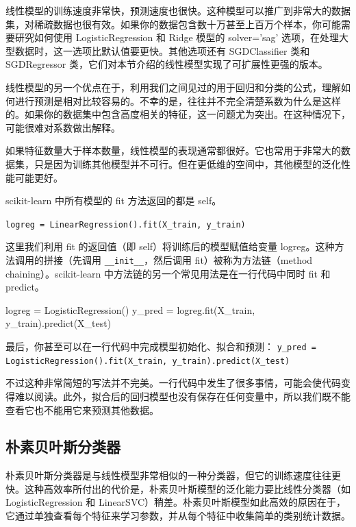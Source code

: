 线性模型的训练速度非常快，预测速度也很快。这种模型可以推广到非常大的数据集，对稀疏数据也很有效。如果你的数据包含数十万甚至上百万个样本，你可能需要研究如何使用 LogisticRegression 和 Ridge 模型的 solver='sag' 选项，在处理大型数据时，这一选项比默认值要更快。其他选项还有 SGDClassifier 类和 SGDRegressor 类，它们对本节介绍的线性模型实现了可扩展性更强的版本。

线性模型的另一个优点在于，利用我们之间见过的用于回归和分类的公式，理解如何进行预测是相对比较容易的。不幸的是，往往并不完全清楚系数为什么是这样的。如果你的数据集中包含高度相关的特征，这一问题尤为突出。在这种情况下，可能很难对系数做出解释。

如果特征数量大于样本数量，线性模型的表现通常都很好。它也常用于非常大的数据集，只是因为训练其他模型并不可行。但在更低维的空间中，其他模型的泛化性能可能更好。

\begin{tcolorbox}[title=方法链]
    scikit-learn 中所有模型的 fit 方法返回的都是 self。

    \verb|logreg = LinearRegression().fit(X_train, y_train)|

    这里我们利用 fit 的返回值（即 self）将训练后的模型赋值给变量 logreg。这种方法调用的拼接（先调用 \verb|__init__|，然后调用 fit）被称为方法链（method chaining）。scikit-learn 中方法链的另一个常见用法是在一行代码中同时 fit 和 predict。

    \begin{pyc}
        logreg = LogisticRegression()
        y_pred = logreg.fit(X_train, y_train).predict(X_test)
    \end{pyc}

    最后，你甚至可以在一行代码中完成模型初始化、拟合和预测：
    \verb|y_pred = LogisticRegression().fit(X_train, y_train).predict(X_test)|

    不过这种非常简短的写法并不完美。一行代码中发生了很多事情，可能会使代码变得难以阅读。此外，拟合后的回归模型也没有保存在任何变量中，所以我们既不能查看它也不能用它来预测其他数据。
\end{tcolorbox}

\subsection{朴素贝叶斯分类器}
朴素贝叶斯分类器是与线性模型非常相似的一种分类器，但它的训练速度往往更快。这种高效率所付出的代价是，朴素贝叶斯模型的泛化能力要比线性分类器（如LogisticRegression 和 LinearSVC）稍差。朴素贝叶斯模型如此高效的原因在于，它通过单独查看每个特征来学习参数，并从每个特征中收集简单的类别统计数据。

